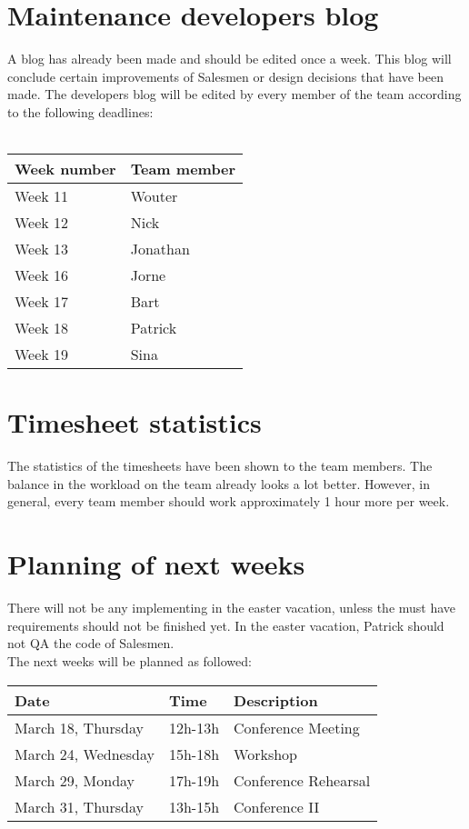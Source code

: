 \documentclass[a4paper, 12pt]{article}
\begin{document}
	\section{Maintenance developers blog}
A blog has already been made and should be edited once a week. This blog will conclude certain improvements of Salesmen or design decisions that have been made.
The developers blog will be edited by every member of the team according to the following deadlines:\\ \\
			\begin{tabular}{l | l }
				\textbf{Week number} & \textbf{Team member} \\
				\hline
				Week 11 &  Wouter\\
				\hline
				Week 12 &  Nick\\
				\hline
				Week 13 &  Jonathan\\
				\hline
				Week 16 &  Jorne\\
				\hline
				Week 17 &  Bart\\
				\hline
				Week 18 &  Patrick\\
				\hline
				Week 19 &  Sina\\
			\end{tabular}
	\section{Timesheet statistics}
The statistics of the timesheets have been shown to the team members. The balance in the workload on the team already looks a lot better. However, in general, every team member should work approximately 1 hour more per week.
	\section{Planning of next weeks}
There will not be any implementing in the easter vacation, unless the must have requirements should not be finished yet. In the easter vacation, Patrick should not QA the code of Salesmen. \\
The next weeks will be planned as followed:
	
			\begin{tabular}{l | l | l }
				\textbf{Date} & \textbf{Time} & \textbf{Description} \\
				\hline
				March 18, Thursday  & 12h-13h & Conference Meeting\\
				\hline
				March 24, Wednesday & 15h-18h & Workshop\\
				\hline
				March 29, Monday    & 17h-19h & Conference Rehearsal\\
				\hline
				March 31, Thursday  & 13h-15h & Conference II\\

			\end{tabular}
\end{document}
